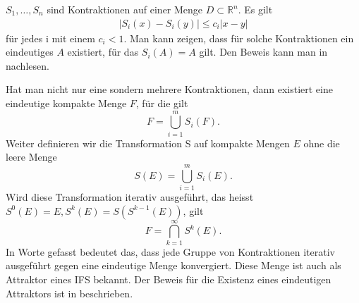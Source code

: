 $S_1,\dots,S_n$ sind Kontraktionen auf einer Menge $D \subset \mathbb{R}^n$. Es gilt
%
\begin{align}
	|S_i(x) - S_i(y)| \leq c_i|x - y|
\end{align}
für jedes i mit einem $c_i < 1$.
Man kann zeigen, dass für solche Kontraktionen ein eindeutiges $A$ existiert, für das $S_i(A) = A$ gilt.
Den Beweis kann man in \cite{ifs:Rousseau2012} nachlesen.

Hat man nicht nur eine sondern mehrere Kontraktionen, dann existiert eine eindeutige kompakte Menge $F$, für die gilt
\begin{equation}
	F = \bigcup\limits_{i = 1}^{m} S_i(F).
\end{equation}
Weiter definieren wir die Transformation S auf kompakte Mengen $E$ ohne die leere Menge
\begin{equation}
	S(E) = \bigcup\limits_{i = 1}^m S_i(E).
	\label{ifs:transformation}
\end{equation}
Wird diese Transformation iterativ ausgeführt, das heisst $S^0(E) = E, S^k(E) = S(S^{k-1}(E))$, gilt
\begin{equation}
	F = \bigcap\limits_{k = 1}^{\infty} S^k(E).
	\label{ifs:ifsForm}
\end{equation}
In Worte gefasst bedeutet das, dass jede Gruppe von Kontraktionen iterativ ausgeführt gegen eine eindeutige Menge konvergiert.
Diese Menge ist auch als Attraktor eines IFS bekannt.
%
Der Beweis für die Existenz eines eindeutigen Attraktors ist in \cite{ifs:fractal-geometry} beschrieben. 

